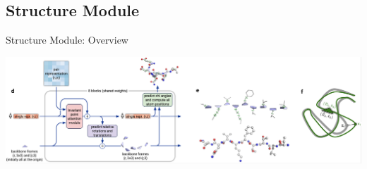 \documentclass[presentation, smaller]{beamer}
\begin{document}
\subsection*{Structure Module}
\label{sec:orgb2dec5f}
\begin{frame}[label={sec:org758e7f0}]{Structure Module: Overview \cite{jumperHighlyAccurateProtein2021}}
\begin{center}
\includegraphics[width=.9\linewidth]{./imgs/model-structure.png}
\end{center}
\end{frame}
\end{document}
